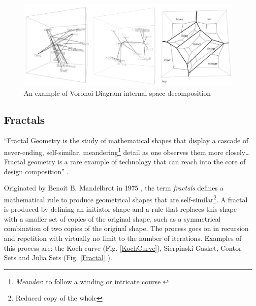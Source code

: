 \begin{figure}[htbp]
\centering
\includegraphics[width=\textwidth]{./Images/8-StructureVoronoi}
\caption[Voronoi Diagram Space Decomposition]{An example of Voronoi Diagram internal space decomposition \cite{friedrich08}}
\label{VDInternal}
\end{figure}

\clearpage
\subsection{Fractals}

``Fractal Geometry is the study of mathematical shapes that display a cascade of never-ending, self-similar, meandering\footnote{\emph{Meander}: to follow a winding or intricate course \cite{merriam03}} detail as one observes them more closely\ldots Fractal geometry is a rare example of technology that can reach into the core of design composition'' \cite{bovill96}.

Originated by Benoit B. Mandelbrot in 1975 \cite{fasoulaki08}, the term \emph{fractals} defines a mathematical rule to produce geometrical shapes that are self-similar\footnote{Reduced copy of the whole}. A fractal is produced by defining an initiator shape and a rule that replaces this shape with a smaller set of copies of the original shape, such as a symmetrical combination of two copies of the original shape. The process goes on in recursion and repetition with virtually no limit to the number of iterations. Examples of this process are: the Koch curve (Fig. \ref{KochCurve}), Sierpinski Gasket, Contor Sets and Julia Sets (Fig. \ref{Fractal} ).

